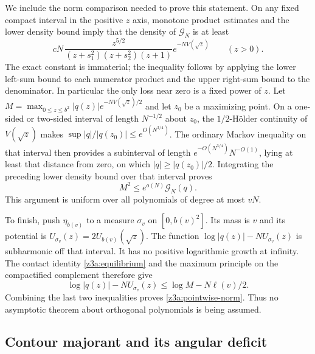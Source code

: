 \documentclass[11pt]{article}
\theoremstyle{definition}\newtheorem{definition}[theorem]{Definition}
\theoremstyle{remark}\newtheorem{remark}[theorem]{Remark}
\begin{document}
We include the norm comparison needed to prove this statement.  On any
fixed compact interval in the positive $z$ axis, monotone product estimates
and the lower density bound imply that the density of $\mathcal G_N$ is
at least
\[
 cN\,\frac{z^{5/2}}{(z+s_1^2)(z+s_2^2)(z+1)}
          e^{-NV(\sqrt z)}\qquad(z>0).
\]
The exact constant is immaterial; the inequality follows by applying
the lower left-sum bound to each numerator product and the upper
right-sum bound to the denominator.  In particular the only loss near
zero is a fixed power of $z$.
Let $M=\max_{0\le z\le b^2}|q(z)|e^{-NV(\sqrt z)/2}$ and let $z_0$
be a maximizing point.  On a one-sided or two-sided interval of length
$N^{-1/2}$ about $z_0$, the $1/2$-H\"older continuity of $V(\sqrt z)$
makes $\sup|q|/|q(z_0)|\le e^{O(N^{3/4})}$.  The ordinary Markov
inequality on that interval then provides a subinterval of length
$e^{-O(N^{3/4})}N^{-O(1)}$, lying at least that distance from zero,
on which $|q|\ge|q(z_0)|/2$.  Integrating the preceding lower density
bound over that interval proves
\[
 M^2\le e^{o(N)}\mathcal G_N(q).
\]
This argument is uniform over all polynomials of degree at most $vN$.

To finish, push $\eta_{b(v)}$ to a measure $\sigma_v$ on $[0,b(v)^2]$.
Its mass is $v$ and its potential is $U_{\sigma_v}(z)=2U_{b(v)}(\sqrt z)$.
The function $\log|q(z)|-NU_{\sigma_v}(z)$ is subharmonic off that interval.
It has no positive logarithmic growth at infinity.  The contact identity
\eqref{z3a:equilibrium} and the maximum principle on the compactified
complement therefore give
\[
 \log|q(z)|-NU_{\sigma_v}(z)\le\log M-N\ell(v)/2.
\]
Combining the last two inequalities proves \eqref{z3a:pointwise-norm}.
Thus no asymptotic theorem about orthogonal polynomials is being assumed.

\subsection{Contour majorant and its angular deficit}
\end{document}
